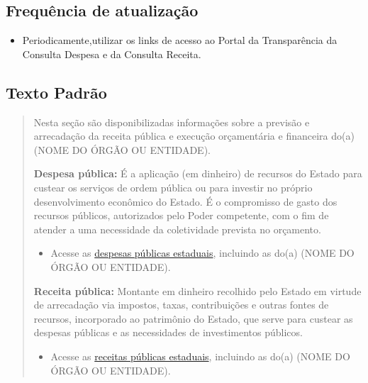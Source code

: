 \documentclass[]{book}
\providecommand{\tightlist}{%
  \setlength{\itemsep}{0pt}\setlength{\parskip}{0pt}}
\begin{document}
\hypertarget{frequuxeancia-de-atualizauxe7uxe3o-4}{%
\subsection{Frequência de atualização}\label{frequuxeancia-de-atualizauxe7uxe3o-4}}

\begin{itemize}
\tightlist
\item
  Periodicamente,utilizar os links de acesso ao Portal da Transparência da Consulta Despesa e da Consulta Receita.
\end{itemize}

\hypertarget{texto-padruxe3o-5}{%
\subsection{Texto Padrão}\label{texto-padruxe3o-5}}

\begin{quote}
Nesta seção são disponibilizadas informações sobre a previsão e arrecadação da receita pública e execução orçamentária e financeira do(a) (NOME DO ÓRGÃO OU ENTIDADE).

\textbf{Despesa pública:} É a aplicação (em dinheiro) de recursos do Estado para custear os serviços de ordem pública ou para investir no próprio desenvolvimento econômico do Estado. É o compromisso de gasto dos recursos públicos, autorizados pelo Poder competente, com o fim de atender a uma necessidade da coletividade prevista no orçamento.

\begin{itemize}
\tightlist
\item
  Acesse as \href{http://www.transparencia.mg.gov.br/despesa-estado/despesa}{despesas públicas estaduais}, incluindo as do(a) (NOME DO ÓRGÃO OU ENTIDADE).
\end{itemize}

\textbf{Receita pública:} Montante em dinheiro recolhido pelo Estado em virtude de arrecadação via impostos, taxas, contribuições e outras fontes de recursos, incorporado ao patrimônio do Estado, que serve para custear as despesas públicas e as necessidades de investimentos públicos.

\begin{itemize}
\tightlist
\item
  Acesse as \href{http://www.transparencia.mg.gov.br/estado-receita}{receitas públicas estaduais}, incluindo as do(a) (NOME DO ÓRGÃO OU ENTIDADE).
\end{itemize}
\end{quote}
\end{document}
